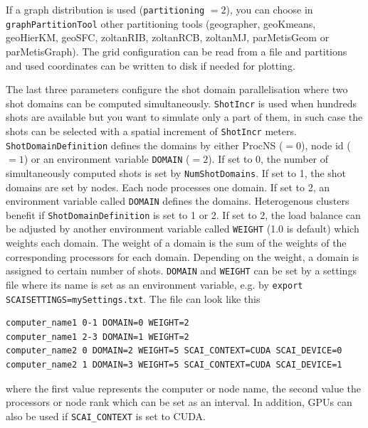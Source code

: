 \documentclass[pdftex,a4paper,parskip,listof=totoc,bibliography=totoc,onehalfspacing,12pt]{scrreprt}
\newcommand{\shellcmd}[1]{\indent\indent\texttt{#1}}	%
\begin{document}
If a graph distribution is used (\verb+partitioning+ $=2$), you can choose in \verb+graphPartitionTool+ other partitioning tools (geographer, geoKmeans, geoHierKM, geoSFC, zoltanRIB, zoltanRCB, zoltanMJ, parMetisGeom or parMetisGraph).
The grid configuration can be read from a file and partitions and used coordinates can be written to disk if needed for plotting.

The last three parameters configure the shot domain parallelisation where two shot domains can be computed simultaneously. 
\verb+ShotIncr+ is used when hundreds shots are available but you want to simulate only a part of them, in such case the shots can be selected with a spatial increment of \verb+ShotIncr+ meters.
\verb+ShotDomainDefinition+ defines the domains by either ProcNS ($=0$), node id ($=1$) or an environment variable \shellcmd{DOMAIN} ($=2$).
If set to 0, the number of simultaneously computed shots is set by \verb+NumShotDomains+. If set to 1, the shot domains are set by nodes. Each node processes one domain. If set to 2, an environment variable called \shellcmd{DOMAIN} defines the domains.
Heterogenous clusters benefit if \verb+ShotDomainDefinition+ is set to 1 or 2. If set to 2, the load balance can be adjusted by another environment variable called \shellcmd{WEIGHT} (1.0 is default) which weights each domain. 
The weight of a domain is the sum of the weights of the corresponding processors for each domain. Depending on the weight, a domain is assigned to certain number of shots.
\shellcmd{DOMAIN} and \shellcmd{WEIGHT} can be set by a settings file where its name is set as an environment variable, e.g. by \shellcmd{export SCAISETTINGS=mySettings.txt}.
The file can look like this 
\begin{verbatim}
computer_name1 0-1 DOMAIN=0 WEIGHT=2
computer_name1 2-3 DOMAIN=1 WEIGHT=2
computer_name2 0 DOMAIN=2 WEIGHT=5 SCAI_CONTEXT=CUDA SCAI_DEVICE=0
computer_name2 1 DOMAIN=3 WEIGHT=5 SCAI_CONTEXT=CUDA SCAI_DEVICE=1
\end{verbatim}
where the first value represents the computer or node name, the second value the processors or node rank which can be set as an interval. In addition, GPUs can also be used if \shellcmd{SCAI\_CONTEXT} is set to CUDA.
\end{document}
